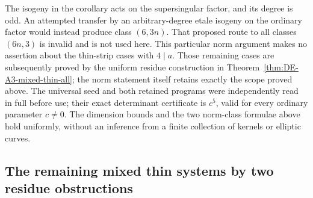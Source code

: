 \begin{remark}
\label{rem:DE-A3-mixed-axis-scope}
The isogeny in the corollary acts on the supersingular factor,
and its degree is odd.
An attempted transfer by an arbitrary-degree etale isogeny on
the ordinary factor would instead produce class $(6,3n)$.
That proposed route to all classes $(6n,3)$ is invalid and is
not used here.  This particular norm argument makes no assertion
about the thin-strip cases with $4\mid a$.
Those remaining cases are subsequently proved by the uniform
residue construction in Theorem~\ref{thm:DE-A3-mixed-thin-all};
the norm statement itself retains exactly the scope proved above.
The universal seed and both retained programs were independently
read in full before use; their exact determinant certificate is
$c^5$, valid for every ordinary parameter $c\ne0$.
The dimension bounds and the two norm-class formulae above
hold uniformly, without an inference from a finite collection
of kernels or elliptic curves.
\end{remark}


\subsection{The remaining mixed thin systems by two residue obstructions}
\label{sec:DE-A3-mixed-thin-residues}


